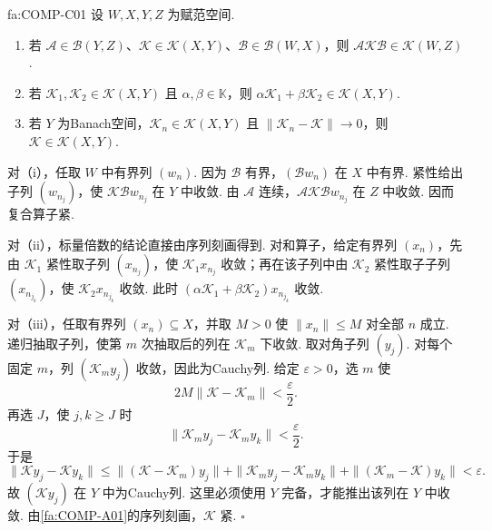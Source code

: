 \begin{FAProposition}{fa:COMP-C01}
设 \(\displaystyle W,X,Y,Z\) 为赋范空间.
\begin{enumerate}[label=\textup{(\roman*)}]
\item 若 \(\displaystyle \mathcal A\in\mathcal B(Y,Z)\)、\(\displaystyle \mathcal K\in\mathcal K(X,Y)\)、\(\displaystyle \mathcal B\in\mathcal B(W,X)\)，则 \(\displaystyle \mathcal A\mathcal K\mathcal B\in\mathcal K(W,Z)\).
\item 若 \(\displaystyle \mathcal K_1,\mathcal K_2\in\mathcal K(X,Y)\) 且 \(\displaystyle \alpha,\beta\in\mathbb K\)，则 \(\displaystyle \alpha\mathcal K_1+\beta\mathcal K_2\in\mathcal K(X,Y)\).
\item 若 \(\displaystyle Y\) 为Banach空间，\(\displaystyle \mathcal K_n\in\mathcal K(X,Y)\) 且 \(\displaystyle \|\mathcal K_n-\mathcal K\|\to0\)，则 \(\displaystyle \mathcal K\in\mathcal K(X,Y)\).
\end{enumerate}
\end{FAProposition}

\begin{FAProof}
对（i），任取 \(\displaystyle W\) 中有界列 \(\displaystyle (w_n)\). 因为 \(\displaystyle \mathcal B\) 有界，\(\displaystyle (\mathcal Bw_n)\) 在 \(\displaystyle X\) 中有界. 紧性给出子列 \(\displaystyle (w_{n_j})\)，使 \(\displaystyle \mathcal K\mathcal Bw_{n_j}\) 在 \(\displaystyle Y\) 中收敛. 由 \(\displaystyle \mathcal A\) 连续，\(\displaystyle \mathcal A\mathcal K\mathcal Bw_{n_j}\) 在 \(\displaystyle Z\) 中收敛. 因而复合算子紧.

对（ii），标量倍数的结论直接由序列刻画得到. 对和算子，给定有界列 \(\displaystyle (x_n)\)，先由 \(\displaystyle \mathcal K_1\) 紧性取子列 \(\displaystyle (x_{n_j})\)，使 \(\displaystyle \mathcal K_1x_{n_j}\) 收敛；再在该子列中由 \(\displaystyle \mathcal K_2\) 紧性取子子列 \(\displaystyle (x_{n_{j_k}})\)，使 \(\displaystyle \mathcal K_2x_{n_{j_k}}\) 收敛. 此时 \(\displaystyle (\alpha\mathcal K_1+\beta\mathcal K_2)x_{n_{j_k}}\) 收敛.

对（iii），任取有界列 \(\displaystyle (x_n)\subseteq X\)，并取 \(\displaystyle M>0\) 使 \(\displaystyle \|x_n\|\leqslant M\) 对全部 \(\displaystyle n\) 成立. 递归抽取子列，使第 \(\displaystyle m\) 次抽取后的列在 \(\displaystyle \mathcal K_m\) 下收敛. 取对角子列 \(\displaystyle (y_j)\). 对每个固定 \(\displaystyle m\)，列 \(\displaystyle (\mathcal K_my_j)\) 收敛，因此为Cauchy列. 给定 \(\displaystyle \varepsilon>0\)，选 \(\displaystyle m\) 使
\[
2M\|\mathcal K-\mathcal K_m\|<\frac{\varepsilon}{2}.
\]
再选 \(\displaystyle J\)，使 \(\displaystyle j,k\geqslant J\) 时
\[
\|\mathcal K_my_j-\mathcal K_my_k\|<\frac{\varepsilon}{2}.
\]
于是
\[
\|\mathcal Ky_j-\mathcal Ky_k\| \leqslant \|(\mathcal K-\mathcal K_m)y_j\| +\|\mathcal K_my_j-\mathcal K_my_k\| +\|(\mathcal K_m-\mathcal K)y_k\| <\varepsilon.
\]
故 \(\displaystyle (\mathcal Ky_j)\) 在 \(\displaystyle Y\) 中为Cauchy列. 这里必须使用 \(\displaystyle Y\) 完备，才能推出该列在 \(\displaystyle Y\) 中收敛. 由\autoref{fa:COMP-A01}的序列刻画，\(\displaystyle \mathcal K\) 紧.
\hfill\(\square\)
\end{FAProof}

